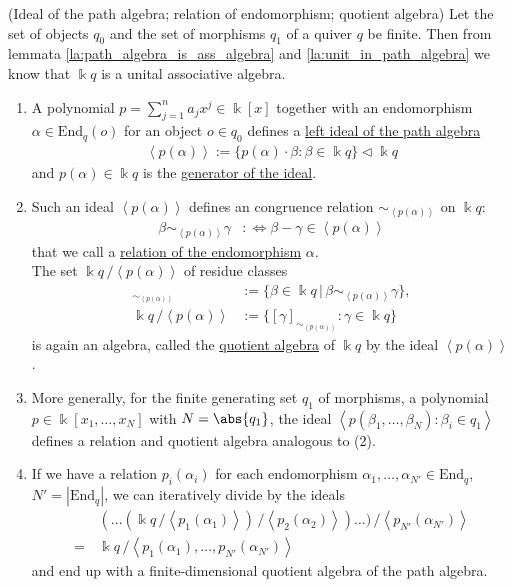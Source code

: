 
\begin{definition}{(Ideal of the path algebra; relation of endomorphism; quotient algebra)}\label{def:relation_of_endo}
Let the set of objects $q_{0}$ and the set of morphisms $q_{1}$ of a quiver $q$ be finite. Then from lemmata
\ref{la:path_algebra_is_ass_algebra} and \ref{la:unit_in_path_algebra} we know that $\Bbbk q$ is a unital associative algebra.
\begin{enumerate}
\renewcommand{\labelenumi}{(\theenumi)}
\item A polynomial $p = \sum_{j=1}^{n} a_{j} x^{j} \in \Bbbk[x]$ together with an endomorphism $\alpha \in \mathrm{End}_{q}(o)$ for an object
$o\in q_{0}$ defines a \ul{left ideal of the path algebra}
\begin{align}
\left< p(\alpha) \right> := \{ p(\alpha)\cdot \beta : \beta \in \Bbbk q \} \vartriangleleft \Bbbk q
\end{align}
and $p(\alpha) \in \Bbbk q$ is the \ul{generator of the ideal}.
\item Such an ideal $\left< p(\alpha) \right>$ defines an congruence relation $\sim_{\left< p(\alpha) \right>}$ on $\Bbbk q$:
\begin{align}
\beta \sim_{\left< p(\alpha) \right>} \gamma &:\Leftrightarrow \beta - \gamma \in \left< p(\alpha) \right>
\end{align}
that we call a \ul{relation of the endomorphism} $\alpha$.\\
The set $\Bbbk q\, / \left< p(\alpha) \right>$ of residue classes
\begin{align}
[\gamma]_{\sim_{\left< p(\alpha) \right>}} &:= \{ \beta \in \Bbbk q \,|\, \beta \sim_{\left< p(\alpha) \right>} \gamma \}, \\
\Bbbk q \,/ \left< p(\alpha) \right> &:= \{ [\gamma]_{\sim_{\left< p(\alpha) \right>}} : \gamma \in \Bbbk q \}
\end{align}
is again an algebra, called the \ul{quotient algebra} of $\Bbbk q$ by the ideal $\left< p(\alpha) \right>$.
\item More generally, for the finite generating set $q_{1}$ of morphisms, a polynomial $p \in \Bbbk[x_{1},\dots,x_{N}]$ with $N = \abs{q_{1}}$,
the ideal $\left< p(\beta_{1},\dots,\beta_{N}) : \beta_{i} \in q_{1} \right>$ defines a relation and quotient algebra analogous to (2).
\item If we have a relation $p_{i}(\alpha_{i})$ for each endomorphism $\alpha_{1},\dots,\alpha_{N'} \in \mathrm{End}_{q}$,
$N' = |\mathrm{End}_{q}|$, we can iteratively divide by the ideals
\begin{align}
&(\dots(\Bbbk q\, / \left< p_{1}(\alpha_{1}) \right> )\, / \left< p_{2}(\alpha_{2}) \right> ) \dots )\, / \left< p_{N'}(\alpha_{N'}) \right> \\
= \,&\Bbbk q\, / \left< p_{1}(\alpha_{1}), \dots, p_{N'}(\alpha_{N'}) \right>\label{eq:relations_ideal}
\end{align}
and end up with a finite-dimensional quotient algebra of the path algebra.
\end{enumerate}
\end{definition}